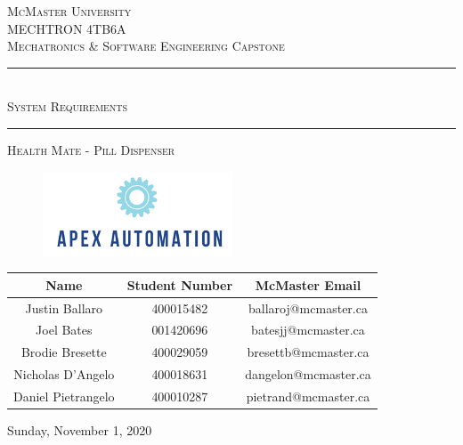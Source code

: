 \documentclass[12pt,titlepage]{article}
\begin{document}
\begin{titlepage}

\newcommand{\HRule}{\rule{\linewidth}{0.5mm}} %

\center %
 

\textsc{\LARGE McMaster University}\\[1.5cm] %
\textsc{\Large MECHTRON 4TB6A}\\[0.5cm] %
\textsc{\large Mechatronics \& Software Engineering Capstone}\\[0.5cm] %

\vspace{1cm}
\HRule \\[0.2cm]
{ \Large \vspace{0.25cm}  \textsc{  \LARGE System Requirements} \vspace{0.3cm} }  %
\HRule \vspace{1cm}

\textsc{\LARGE Health Mate - Pill Dispenser}
 
 \begin{figure}[h]
  \centering
  \includegraphics[width=.4\linewidth]{../ApexEngineering.png}
\end{figure}
 \vspace{1cm}
 

\begin{table}[ht!]
\centering
\begin{tabular}{c c c}
\toprule
\textbf{Name} & \textbf{Student Number} & \textbf{McMaster Email}         \\ \midrule
Justin Ballaro & 400015482 & ballaroj@mcmaster.ca \\
Joel Bates & 001420696 & batesjj@mcmaster.ca \\
Brodie Bresette & 400029059 & bresettb@mcmaster.ca \\
Nicholas D'Angelo & 400018631 &  dangelon@mcmaster.ca  \\
Daniel Pietrangelo & 400010287 &  pietrand@mcmaster.ca \\
  \bottomrule
\end{tabular}
\label{Tab:HU}
\end{table}

\vfill
{\large Sunday, November 1, 2020}\\[3cm] %

\end{titlepage}
\end{document}
